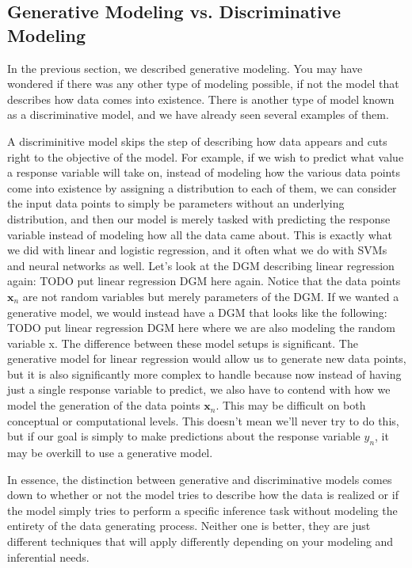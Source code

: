 \subsection{Generative Modeling vs. Discriminative Modeling}
In the previous section, we described generative modeling. You may have wondered if there was any other type of modeling possible, if not the model that describes how data comes into existence. There is another type of model known as a discriminative model, and we have already seen several examples of them.

A discriminitive model skips the step of describing how data appears and cuts right to the objective of the model. For example, if we wish to predict what value a response variable will take on, instead of modeling how the various data points come into existence by assigning a distribution to each of them, we can consider the input data points to simply be parameters without an underlying distribution, and then our model is merely tasked with predicting the response variable instead of modeling how all the data came about. This is exactly what we did with linear and logistic regression, and it often what we do with SVMs and neural networks as well. Let's look at the DGM describing linear regression again:
TODO put linear regression DGM here again.
Notice that the data points $\textbf{x}_n$ are not random variables but merely parameters of the DGM. If we wanted a generative model, we would instead have a DGM that looks like the following:
TODO put linear regression DGM here where we are also modeling the random variable x.
The difference between these model setups is significant. The generative model for linear regression would allow us to generate new data points, but it is also significantly more complex to handle because now instead of having just a single response variable to predict, we also have to contend with how we model the generation of the data points $\textbf{x}_n$. This may be difficult on both conceptual or computational levels. This doesn't mean we'll never try to do this, but if our goal is simply to make predictions about the response variable $y_n$, it may be overkill to use a generative model.

In essence, the distinction between generative and discriminative models comes down to whether or not the model tries to describe how the data is realized or if the model simply tries to perform a specific inference task without modeling the entirety of the data generating process. Neither one is better, they are just different techniques that will apply differently depending on your modeling and inferential needs.


